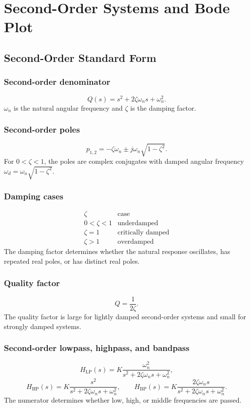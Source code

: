 \section{Second-Order Systems and Bode Plot}

\subsection{Second-Order Standard Form}

\subsubsection{Second-order denominator}
\[
Q(s)=s^2+2\zeta\omega_n s+\omega_n^2.
\]
\(\omega_n\) is the natural angular frequency and \(\zeta\) is the damping factor.

\subsubsection{Second-order poles}
\[
p_{1,2}=-\zeta\omega_n\pm j\omega_n\sqrt{1-\zeta^2}.
\]
For \(0<\zeta<1\), the poles are complex conjugates with damped angular frequency \(\omega_d=\omega_n\sqrt{1-\zeta^2}\).

\subsubsection{Damping cases}
\[
\begin{array}{c|c}
\zeta & \text{case}\\ \hline
0<\zeta<1 & \text{underdamped}\\
\zeta=1 & \text{critically damped}\\
\zeta>1 & \text{overdamped}
\end{array}
\]
The damping factor determines whether the natural response oscillates, has repeated real poles, or has distinct real poles.

\subsubsection{Quality factor}
\[
Q=\frac{1}{2\zeta}.
\]
The quality factor is large for lightly damped second-order systems and small for strongly damped systems.

\subsubsection{Second-order lowpass, highpass, and bandpass}
\[
H_{\mathrm{LP}}(s)=K\frac{\omega_n^2}{s^2+2\zeta\omega_n s+\omega_n^2},
\]
\[
H_{\mathrm{HP}}(s)=K\frac{s^2}{s^2+2\zeta\omega_n s+\omega_n^2},
\qquad
H_{\mathrm{BP}}(s)=K\frac{2\zeta\omega_n s}{s^2+2\zeta\omega_n s+\omega_n^2}.
\]
The numerator determines whether low, high, or middle frequencies are passed.

